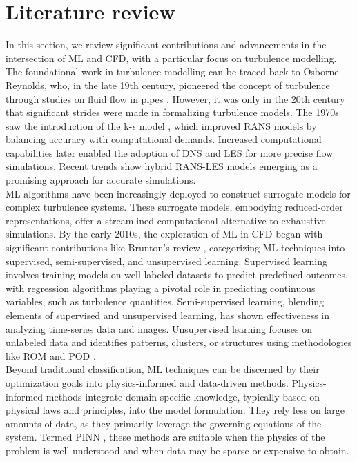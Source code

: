 \section{Literature review}
In this section, we review significant contributions and advancements in the intersection of ML and CFD, with a particular focus on turbulence modelling. The foundational work in turbulence modelling can be traced back to Osborne Reynolds, who, in the late 19th century, pioneered the concept of turbulence through studies on fluid flow in pipes \cite{reynolds1895dynamical}. However, it was only in the 20th century that significant strides were made in formalizing turbulence models. The 1970s saw the introduction of the k-$\epsilon$ model \cite{launder1974application}, which improved RANS models by balancing accuracy with computational demands. Increased computational capabilities later enabled the adoption of DNS and \gls{LES} \cite{smagorinsky1963general} for more precise flow simulations. Recent trends show hybrid RANS-LES models emerging as a promising approach for accurate simulations.\\
ML algorithms have been increasingly deployed to construct surrogate models for complex turbulence systems. These surrogate models, embodying reduced-order representations, offer a streamlined computational alternative to exhaustive simulations. By the early 2010s, the exploration of ML in CFD began with significant contributions like Brunton's review \cite{brunton}, categorizing ML techniques into supervised, semi-supervised, and unsupervised learning. Supervised learning involves training models on well-labeled datasets to predict predefined outcomes, with regression algorithms playing a pivotal role in predicting continuous variables, such as turbulence quantities. Semi-supervised learning, blending elements of supervised and unsupervised learning, has shown effectiveness in analyzing time-series data and images. Unsupervised learning focuses on unlabeled data and identifies patterns, clusters, or structures using methodologies like ROM and POD \cite{berkooz1993proper}.\\
Beyond traditional classification, ML techniques can be discerned by their optimization goals into physics-informed and data-driven methods. Physics-informed methods integrate domain-specific knowledge, typically based on physical laws and principles, into the model formulation. They rely less on large amounts of data, as they primarily leverage the governing equations of the system. Termed \gls{PINN} \cite{raissi2019physics}, these methods are suitable when the physics of the problem is well-understood and when data may be sparse or expensive to obtain. \\
